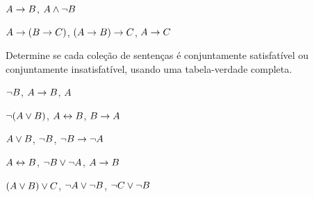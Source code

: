 \begin{compactlist}
% 
%


\item $A \rightarrow B$, $A \wedge \neg B$\vspace{.5ex} %

\item $A \rightarrow (B \rightarrow C)$, $(A \rightarrow B) \rightarrow C$, $A \rightarrow C$\vspace{.5ex} %

\end{compactlist}

\noindent\problempart
\label{pr.TT.satisfiable3}
Determine se cada coleção de sentenças é conjuntamente satisfatível ou conjuntamente insatisfatível, usando uma tabela-verdade completa.
\begin{compactlist}
\item $\neg B$, $A \rightarrow B$, $A$ \vspace{.5ex}%
\item $\neg(A \vee B)$, $A \leftrightarrow B$, $B \rightarrow A$\vspace{.5ex} %
\item $A \vee B$, $\neg B$, $\neg B \rightarrow \neg A$\vspace{.5ex} %
\item $A \leftrightarrow B$, $\neg B \vee \neg A$, $A \rightarrow B$\vspace{.5ex} %
\item $(A \vee B) \vee C$, $\neg A \vee \neg B$, $\neg C \vee \neg B$\vspace{.5ex} %
\end{compactlist}




